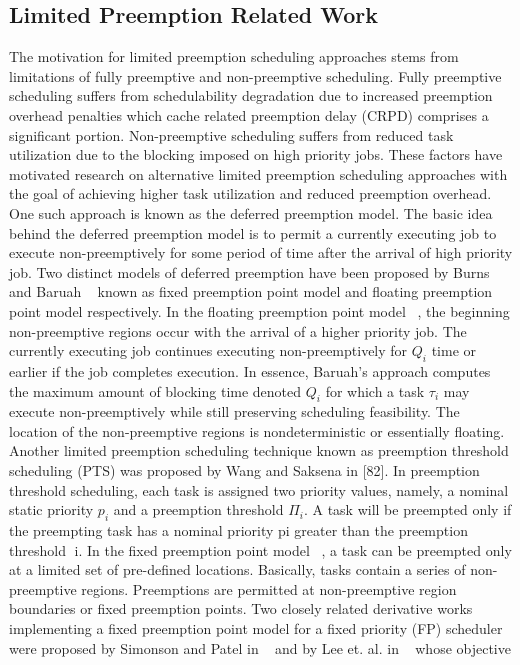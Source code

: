 \subsection {Limited Preemption Related Work}\label{sec:lp_related_work}
The motivation for limited preemption scheduling approaches stems from limitations of fully preemptive and non-preemptive scheduling.  Fully preemptive scheduling suffers from schedulability degradation due to increased preemption overhead penalties which cache related preemption delay (CRPD) comprises a significant portion.  Non-preemptive scheduling suffers from reduced task utilization due to the blocking imposed on high priority jobs.  These factors have motivated research on alternative limited preemption scheduling approaches with the goal of achieving higher task utilization and reduced preemption overhead.  One such approach is known as the deferred preemption model.  The basic idea behind the deferred preemption model is to permit a currently executing job to execute non-preemptively for some period of time after the arrival of high priority job.  Two distinct models of deferred preemption have been proposed by Burns ~\cite{burns:05} and Baruah ~\cite{baruah:05} known as fixed preemption point model and floating preemption point model respectively.  In the floating preemption point model ~\cite{baruah:05}, the beginning non-preemptive regions occur with the arrival of a higher priority job.  The currently executing job continues executing non-preemptively for \begin{math}Q_{i}\end{math} time or earlier if the job completes execution. In essence, Baruah’s approach computes the maximum amount of blocking time denoted \begin{math}Q_{i}\end{math} for which a task \begin{math}\tau_{i}\end{math} may execute non-preemptively while still preserving scheduling feasibility. The location of the non-preemptive regions is nondeterministic or essentially floating.  Another limited preemption scheduling technique known as preemption threshold scheduling (PTS) was proposed by Wang and Saksena in [82].  In preemption threshold scheduling, each task is assigned two priority values, namely, a nominal static priority \begin{math}p_{i}\end{math} and a preemption threshold \begin{math}\Pi_{i}\end{math}.  A task will be preempted only if the preempting task has a nominal priority pi greater than the preemption threshold i. In the fixed preemption point model ~\cite{burns:05}, a task can be preempted only at a limited set of pre-defined locations. Basically, tasks contain a series of non-preemptive regions.  Preemptions are permitted at non-preemptive region boundaries or fixed preemption points. Two closely related derivative works implementing a fixed preemption point model for a fixed priority (FP) scheduler were proposed by Simonson and Patel in ~\cite{simonson:95} and by Lee et. al. in ~\cite{lee:98} whose objective 